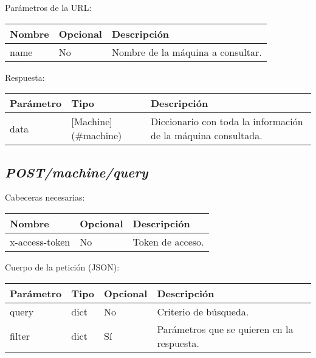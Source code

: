 Parámetros de la URL:
\begin{table}[h!]
	\centering
	\begin{adjustbox}{max width=\textwidth}
	\begin{tabular}{|l|l|l|}
		\hline
		Nombre & Opcional & Descripción \\ \hline
		name & No & Nombre de la máquina a consultar. \\ \hline
	\end{tabular}
\end{adjustbox}
\end{table}

Respuesta:
\begin{table}[h!]
	\centering
	\begin{adjustbox}{max width=\textwidth}
	\begin{tabular}{|l|l|l|}
		\hline
		Parámetro & Tipo & Descripción \\ \hline
		data & [Machine](\#machine) & Diccionario con toda la información de la máquina consultada. \\ \hline
	\end{tabular}
\end{adjustbox}
\end{table}



\subsection{\textit{POST/machine/query}}

Cabeceras necesarias:
\begin{table}[h!]
	\centering
	\begin{adjustbox}{max width=\textwidth}
	\begin{tabular}{|l|l|l|}
		\hline
		Nombre & Opcional & Descripción \\ \hline
		x-access-token & No & Token de acceso. \\ \hline
	\end{tabular}
\end{adjustbox}
\end{table}

Cuerpo de la petición (JSON):
\begin{table}[h!]
	\centering
	\begin{adjustbox}{max width=\textwidth}
	\begin{tabular}{|l|l|l|l|}
		\hline
		Parámetro & Tipo & Opcional & Descripción \\ \hline
		query & dict & No & Criterio de búsqueda. \\ \hline
		filter & dict & Sí & Parámetros que se quieren en la respuesta. \\ \hline
	\end{tabular}
\end{adjustbox}
\end{table}

